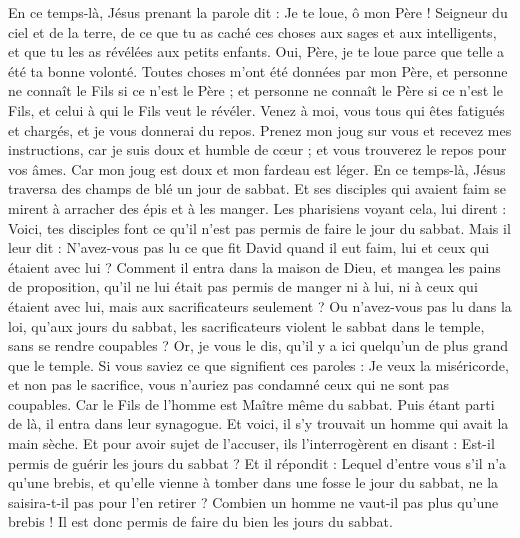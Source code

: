 \begin{multicols}{2}
En ce temps-là, Jésus prenant la parole dit : Je te loue, ô mon Père ! Seigneur du ciel et de la terre, de ce que tu as caché ces choses aux sages et aux intelligents, et que tu les as révélées aux petits enfants.
Oui, Père, je te loue parce que telle a été ta bonne volonté.
Toutes choses m'ont été données par mon Père, et personne ne connaît le Fils si ce n'est le Père ; et personne ne connaît le Père si ce n'est le Fils, et celui à qui le Fils veut le révéler.
Venez à moi, vous tous qui êtes fatigués et chargés, et je vous donnerai du repos.
Prenez mon joug sur vous et recevez mes instructions, car je suis doux et humble de cœur ; et vous trouverez le repos pour vos âmes.
Car mon joug est doux et mon fardeau est léger.
\VerseOne{}En ce temps-là, Jésus traversa des champs de blé un jour de sabbat. Et ses disciples qui avaient faim se mirent à arracher des épis et à les manger.
Les pharisiens voyant cela, lui dirent : Voici, tes disciples font ce qu'il n'est pas permis de faire le jour du sabbat.
Mais il leur dit : N'avez-vous pas lu ce que fit David quand il eut faim, lui et ceux qui étaient avec lui ?
Comment il entra dans la maison de Dieu, et mangea les pains de proposition, qu'il ne lui était pas permis de manger ni à lui, ni à ceux qui étaient avec lui, mais aux sacrificateurs seulement ?
Ou n'avez-vous pas lu dans la loi, qu'aux jours du sabbat, les sacrificateurs violent le sabbat dans le temple, sans se rendre coupables ?
Or, je vous le dis, qu'il y a ici quelqu'un de plus grand que le temple.
Si vous saviez ce que signifient ces paroles : Je veux la miséricorde, et non pas le sacrifice, vous n'auriez pas condamné ceux qui ne sont pas coupables.
Car le Fils de l'homme est Maître même du sabbat.
Puis étant parti de là, il entra dans leur synagogue.
Et voici, il s'y trouvait un homme qui avait la main sèche. Et pour avoir sujet de l'accuser, ils l'interrogèrent en disant : Est-il permis de guérir les jours du sabbat ?
Et il répondit : Lequel d'entre vous s'il n'a qu'une brebis, et qu'elle vienne à tomber dans une fosse le jour du sabbat, ne la saisira-t-il pas pour l'en retirer ?
Combien un homme ne vaut-il pas plus qu'une brebis ! Il est donc permis de faire du bien les jours du sabbat.

\end{multicols}
